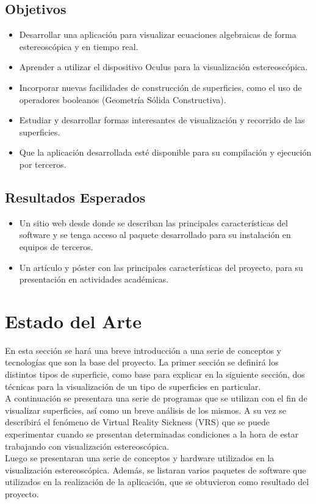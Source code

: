 \documentclass[12pt]{article}
\begin{document}
\subsection{Objetivos}
\begin{itemize}
\item Desarrollar una aplicación para visualizar ecuaciones algebraicas de forma estereoscópica y en tiempo real.
\item Aprender a utilizar el dispositivo Oculus para la visualización estereoscópica. 
\item Incorporar nuevas facilidades de construcción de superficies, como el uso de operadores booleanos (Geometría Sólida Constructiva). 
\item Estudiar y desarrollar formas interesantes de visualización y recorrido de las superficies.
\item Que la aplicación desarrollada esté disponible para su compilación y ejecución por terceros. 
\end{itemize}
\subsection{Resultados Esperados}
\begin{itemize}
\item Un sitio web desde donde se describan las principales características del software y se tenga acceso al paquete desarrollado para su instalación en equipos de terceros. 
\item Un artículo y póster con las principales características del proyecto, para su presentación en actividades académicas.
\end{itemize}
\clearpage
\section{Estado del Arte}
En esta sección se hará una breve introducción a una serie de conceptos y tecnologías que son la base del proyecto. La primer sección se definirá los distintos tipos de superficie, como base para explicar en la siguiente sección, dos técnicas para la visualización de un tipo de superficies en particular. 
\\A continuación se presentara una serie de programas que se utilizan con el fin de visualizar superficies, así como un breve análisis de los mismos. A su vez se describirá el fenómeno de Virtual Reality Sickness (VRS) que se puede experimentar cuando se presentan determinadas condiciones a la hora de estar trabajando con visualización estereoscópica.
\\Luego se presentaran una serie de conceptos y hardware utilizados en la visualización estereoscópica. Además, se listaran varios paquetes de software que utilizados en la realización de la aplicación, que se obtuvieron como resultado del proyecto.
\end{document}

